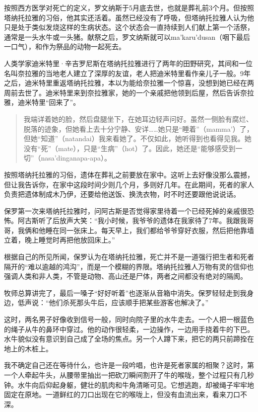 \documentclass[12pt,oneside]{book}
\begin{document}
\begin{bookref}[frametitle={\cite{好好告别：世界葬礼观察手记}}]
按照西方医学对死亡的定义，罗文纳斯于5月底去世，也就是葬礼前3个月。但按照塔纳托拉雅的习俗，他其实还活着。虽然已经没有了呼吸，但塔纳托拉雅人认为他只是处于类似发烧这样的生病状态。这个状态会一直持续到人们献上第一个活祭，通常是一头水牛或一头猪。献祭之后，罗文纳斯就可以ma’karu’dusan（咽下最后一口气），和作为祭品的动物一起死去。

人类学家迪米特里·辛吉罗尼斯在塔纳托拉雅进行了两年的田野研究，其间和一位名叫奈拉雅的当地老人建立了深厚的友谊，老人把迪米特里看作亲儿子一般。9年之后，迪米特里重返塔纳托拉雅，本以为能给奈拉雅一个惊喜，没想到她已经在两周前去世了。迪米特里来到奈拉雅家，她的一个亲戚把他领到后屋，然后告诉奈拉雅，迪米特里“回来了”。

\begin{quotation}
我端详着她的脸，然后盘腿坐下，在她耳边轻声问好。虽然一侧脸有腐烂、脱落的迹象，但她看上去十分宁静、安详……她只是“睡着”（mamma’）了，但她“知道”（natandai）我来看她了。不仅如此，她听得到也看得见我。她没有“死”（mate），只是“生病”（hot）了。因此，她还是“能够感受到一切”（nasa’dinganapa-apa）。
\end{quotation}

按照塔纳托拉雅的习俗，遗体在葬礼之前要放在家中。这听上去好像没那么震撼，但让我告诉你，在家中这段时间少则几个月，多则好几年。在此期间，死者的家人负责把遗体制成木乃伊，还要给他送饭、换洗衣物，时不时还要跟他说说话。

保罗第一次来塔纳托拉雅时，问阿古斯是否觉得家里待着一个已经死掉的亲戚很恐怖。阿古斯听了后放声大笑：“我小时候，我爷爷的遗体在我家待了7年。我跟我哥哥，我俩和他睡在同一张床上。每天早上，我们都给爷爷穿好衣服，然后把他靠墙立着，晚上睡觉时再把他放回床上。”

根据自己的所见所闻，保罗认为在塔纳托拉雅，死亡并不是一道强行把生者和死者隔开的“难以逾越的鸿沟”，而是一个模糊的界限。塔纳托拉雅人万物有灵的信仰也强调人类和非人类，不管是动物、高山还是尸体，两者之间都没有绝对的隔阂。

牧师总算讲完了，最后一嗓子“好好听着”也逐渐从音箱中消失。保罗轻轻走到我身边，低声说：“他们杀死那头牛后，应该顺手把某些游客也解决了。”

这时，两名男子好像收到信号一般，同时向院子里的水牛走去。一个人把一根蓝色的绳子从牛的鼻环中穿过。他的动作很轻柔，一边操作，一边用手挠着牛的下巴。水牛貌似没有意识到自己成了全场的焦点。另一个人蹲下来，把它的两只前蹄拴在地上的木桩上。

我不确定自己还在等待什么，也许是一段吟唱，也许是死者家属的相聚？这时，第一个人牵起牛头，从腰带里抽出一把砍刀瞬间割开了牛的喉咙，整个过程只有几秒钟。水牛向后仰起身躯，健壮的肌肉和牛角清晰可见。它想逃跑，却被绳子牢牢地固定在原地。一道鲜红的刀口出现在它的喉咙上，但没有血流出来，看来刀口不深。


\end{bookref}
\end{document}

